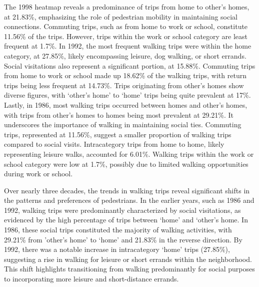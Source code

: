 \documentclass[12pt,twoside]{reedthesis}
\begin{document}
The 1998 heatmap reveals a predominance of trips from home to other's homes, at 21.83\%, emphasizing the role of pedestrian mobility in maintaining social connections. Commuting trips, such as from home to work or school, constitute 11.56\% of the trips. However, trips within the work or school category are least frequent at 1.7\%. In 1992, the most frequent walking trips were within the home category, at 27.85\%, likely encompassing leisure, dog walking, or short errands. Social visitations also represent a significant portion, at 15.88\%. Commuting trips from home to work or school made up 18.62\% of the walking trips, with return trips being less frequent at 14.73\%. Trips originating from other's homes show diverse figures, with `other's home' to `home' trips being quite prevalent at 17\%. Lastly, in 1986, most walking trips occurred between homes and other's homes, with trips from other's homes to homes being most prevalent at 29.21\%. It underscores the importance of walking in maintaining social ties. Commuting trips, represented at 11.56\%, suggest a smaller proportion of walking trips compared to social visits. Intracategory trips from home to home, likely representing leisure walks, accounted for 6.01\%. Walking trips within the work or school category were low at 1.7\%, possibly due to limited walking opportunities during work or school.

Over nearly three decades, the trends in walking trips reveal significant shifts in the patterns and preferences of pedestrians. In the earlier years, such as 1986 and 1992, walking trips were predominantly characterized by social visitations, as evidenced by the high percentage of trips between `home' and `other's home. In 1986, these social trips constituted the majority of walking activities, with 29.21\% from 'other's home' to `home' and 21.83\% in the reverse direction. By 1992, there was a notable increase in intracategory `home' trips (27.85\%), suggesting a rise in walking for leisure or short errands within the neighborhood. This shift highlights transitioning from walking predominantly for social purposes to incorporating more leisure and short-distance errands.
\end{document}
